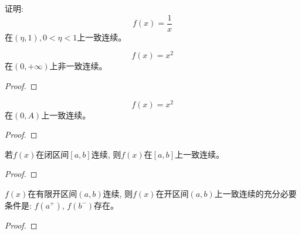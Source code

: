 \begin{proposition}
    证明:
    \[  f(x) = \frac{1}{x} \]
    在$(\eta, 1), 0 < \eta < 1$上一致连续。
\end{proposition}

\begin{proposition}
    \[ f(x) = x^2 \]
    在$(0, +\infty)$上非一致连续。
\end{proposition}
\begin{proof}
    
\end{proof}

\begin{proposition}
    \[ f(x) = x^2 \]
    在$(0, A)$上一致连续。
\end{proposition}
\begin{proof}
    
\end{proof}

\begin{theorem}[Cantor定理]
    若$f(x)$在闭区间$[a, b]$连续, 则$f(x)$在$[a, b]$上一致连续。
\end{theorem}
\begin{proof}
    
\end{proof}

\begin{theorem}
    $f(x)$在有限开区间$(a, b)$连续, 则$f(x)$在开区间$(a,b)$上一致连续的充分必要条件是: $f(a^+)$, $f(b^-)$存在。
\end{theorem}
\begin{proof}
    
\end{proof}